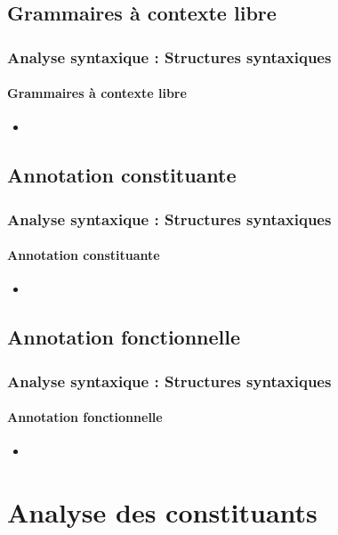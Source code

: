 \documentclass[xcolor=table]{beamer}
\begin{document}
\subsection{Grammaires à contexte libre}

\begin{frame}
\frametitle{Analyse syntaxique : Structures syntaxiques}
\framesubtitle{Grammaires à contexte libre}

\begin{itemize}
	\item 
\end{itemize}

\end{frame}

\subsection{Annotation constituante}

\begin{frame}
\frametitle{Analyse syntaxique : Structures syntaxiques}
\framesubtitle{Annotation constituante}

\begin{itemize}
	\item 
\end{itemize}

\end{frame}

\subsection{Annotation fonctionnelle}

\begin{frame}
\frametitle{Analyse syntaxique : Structures syntaxiques}
\framesubtitle{Annotation fonctionnelle}

\begin{itemize}
	\item 
\end{itemize}

\end{frame}

\section{Analyse des constituants}
\end{document}
